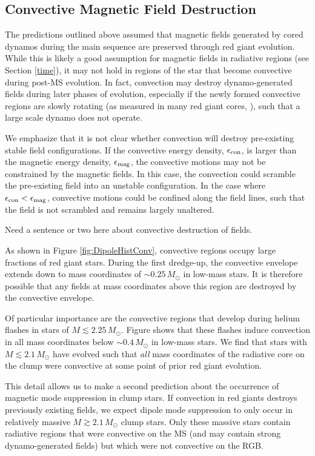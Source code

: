 \subsection{Convective Magnetic Field Destruction}

The predictions outlined above assumed that magnetic fields generated by cored dynamos during the main sequence are preserved through red giant evolution. While this is likely a good assumption for magnetic fields in radiative regions (see Section \ref{time}), it may not hold in regions of the star that become convective during post-MS evolution. In fact, convection may destroy dynamo-generated fields during later phases of evolution, especially if the newly formed convective regions are slowly rotating (as measured in many red giant cores, \cite{Mosser_2012}), such that a large scale dynamo does not operate.

We emphasize that it is not clear whether convection will destroy pre-existing stable field configurations. If the convective energy density, $\epsilon_{\rm con}$, is larger than the magnetic energy density, $\epsilon_{\rm mag}$, the convective motions may not be constrained by the magnetic fields. In this case, the convection could scramble the pre-existing field into an unstable configuration. In the case where $\epsilon_{\rm con} < \epsilon_{\rm mag}$, convective motions could be confined along the field lines, such that the field is not scrambled and remains largely unaltered.

Need a sentence or two here about convective destruction of fields. 

As shown in Figure \ref{fig:DipoleHistConv}, convective regions occupy large fractions of red giant stars. During the first dredge-up, the convective envelope extends down to mass coordinates of $ \sim 0.25 \! \, M_\odot$ in low-mass stars. It is therefore possible that any fields at mass coordinates above this region are destroyed by the convective envelope.

Of particular importance are the convective regions that develop during helium flashes in stars of $M \lesssim 2.25 \, M_\odot$. Figure \label{fig:DipoleHistConv} shows that these flashes induce convection in all mass coordinates below $ \sim \! 0.4 \, M_\odot$ in low-mass stars. We find that stars with $M \lesssim 2.1 \, M_\odot$ have evolved such that {\it all} mass coordinates  of the radiative core on the clump were convective at some point of prior red giant evolution. 

This detail allows us to make a second prediction about the occurrence of magnetic mode suppression in clump stars. If convection in red giants destroys previously existing fields, we expect dipole mode suppression to only occur in relatively massive $M \gtrsim 2.1 \, M_\odot$ clump stars. Only these massive stars contain radiative regions that were convective on the MS (and may contain strong dynamo-generated fields) but which were not convective on the RGB. 

